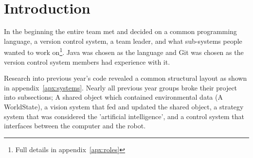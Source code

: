 \section{Introduction}

In the beginning the entire team met and decided on a common programming language,
a version control system, a team leader, and what sub-systems people
wanted to work on\footnote{Full details in appendix~\ref{apx:roles}}. Java was
chosen as the language and Git was chosen as the version control system
members had experience with it.

Research into previous year's code revealed a common structural layout as shown
in appendix~\ref{apx:systems}.  Nearly all previous year groups broke their
project into subsections; A shared object which contained environmental data (A
WorldState), a vision system that fed and updated the shared object, a strategy
system that was considered the 'artificial intelligence', and a control system
that interfaces between the computer and the robot. 
